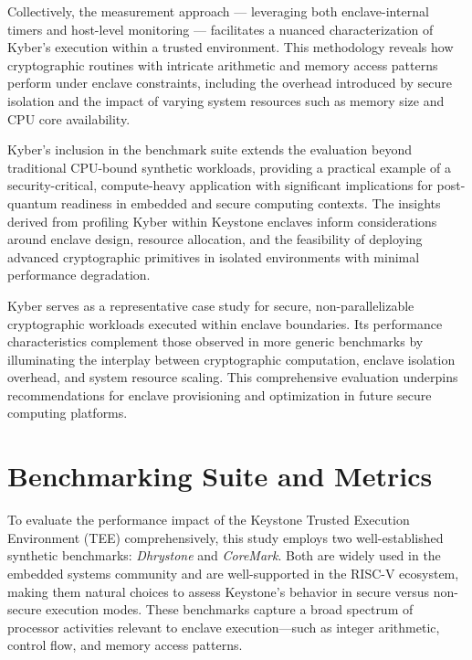 Collectively, the measurement approach — leveraging both enclave-internal timers and host-level monitoring — facilitates a nuanced characterization of Kyber’s execution within a trusted environment. This methodology reveals how cryptographic routines with intricate arithmetic and memory access patterns perform under enclave constraints, including the overhead introduced by secure isolation and the impact of varying system resources such as memory size and CPU core availability.

Kyber’s inclusion in the benchmark suite extends the evaluation beyond traditional CPU-bound synthetic workloads, providing a practical example of a security-critical, compute-heavy application with significant implications for post-quantum readiness in embedded and secure computing contexts. The insights derived from profiling Kyber within Keystone enclaves inform considerations around enclave design, resource allocation, and the feasibility of deploying advanced cryptographic primitives in isolated environments with minimal performance degradation.

Kyber serves as a representative case study for secure, non-parallelizable cryptographic workloads executed within enclave boundaries. Its performance characteristics complement those observed in more generic benchmarks by illuminating the interplay between cryptographic computation, enclave isolation overhead, and system resource scaling. This comprehensive evaluation underpins recommendations for enclave provisioning and optimization in future secure computing platforms.


\section{Benchmarking Suite and Metrics}
\label{sec:benchmarking-tools}

To evaluate the performance impact of the Keystone Trusted Execution Environment (TEE) comprehensively, this study employs two well-established synthetic benchmarks: \textit{Dhrystone} and \textit{CoreMark}. Both are widely used in the embedded systems community and are well-supported in the RISC-V ecosystem, making them natural choices to assess Keystone’s behavior in secure versus non-secure execution modes. These benchmarks capture a broad spectrum of processor activities relevant to enclave execution—such as integer arithmetic, control flow, and memory access patterns.

